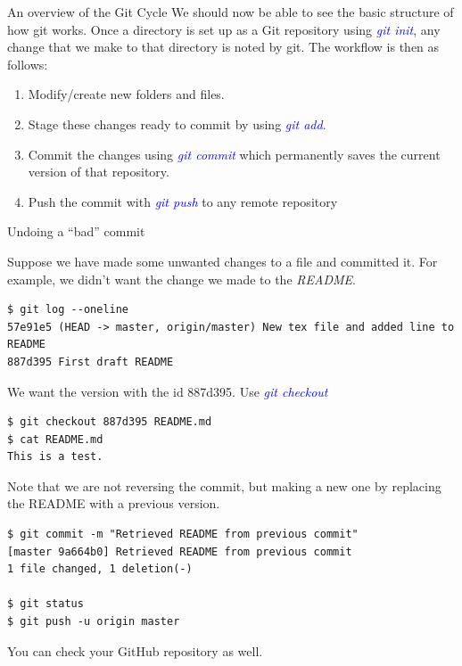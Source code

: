 \documentclass[11pt]{beamer}
\begin{document}
\begin{frame}[fragile]{An overview of the Git Cycle}
We should now be able to see the basic structure of how git works. Once a directory is set up as a Git repository using \textcolor{blue}{\emph{git init}}, any change that we make to that directory is noted by git. The workflow is then as follows:
\begin{enumerate}
	\item
	Modify/create new folders and files.
	\item
	Stage these changes ready to commit by using \textcolor{blue}{\emph{git add}}.
	\item
	Commit the changes using \textcolor{blue}{\emph{git commit}} which permanently saves the current version of that repository.
	\item
	Push the commit with \textcolor{blue}{\emph{git push}} to any remote repository
\end{enumerate}
\end{frame}
\begin{frame}[fragile]{Undoing a ``bad'' commit}

Suppose we have made some unwanted changes to a file and committed it. For example, we didn't want the change we made to the \emph{README}.

\begin{lstlisting}
$ git log --oneline
57e91e5 (HEAD -> master, origin/master) New tex file and added line to README
887d395 First draft README
\end{lstlisting}

We want the version with the id 887d395. Use \textcolor{blue}{\emph{git checkout}}
\begin{lstlisting}
$ git checkout 887d395 README.md
$ cat README.md
This is a test.
\end{lstlisting}


Note that we are not reversing the commit, but making a new one by replacing the README with a previous version.

\begin{lstlisting}
$ git commit -m "Retrieved README from previous commit"
[master 9a664b0] Retrieved README from previous commit
1 file changed, 1 deletion(-)

$ git status
$ git push -u origin master
\end{lstlisting}
You can check your GitHub repository as well.
\end{frame}
\end{document}
